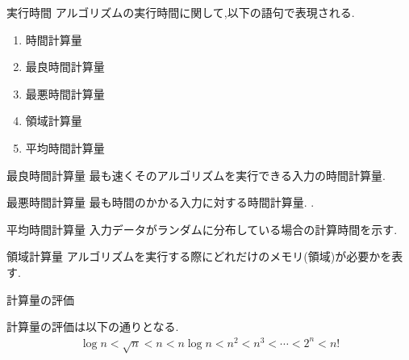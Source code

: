 \begin{frame}{実行時間}
    アルゴリズムの実行時間に関して,以下の語句で表現される.
    \begin{enumerate}
        \item 時間計算量
        \item 最良時間計算量
        \item 最悪時間計算量
        \item 領域計算量
        \item 平均時間計算量
    \end{enumerate}
    \begin{block}{最良時間計算量}
        最も速くそのアルゴリズムを実行できる入力の時間計算量.
    \end{block}
    \begin{block}{最悪時間計算量}
        最も時間のかかる入力に対する時間計算量. .
    \end{block}
    \begin{block}{平均時間計算量}
        入力データがランダムに分布している場合の計算時間を示す.
    \end{block}
    \begin{block}{領域計算量}
        アルゴリズムを実行する際にどれだけのメモリ(領域)が必要かを表す.
    \end{block}
\end{frame}

\begin{frame}{計算量の評価}
\begin{block}{}
計算量の評価は以下の通りとなる.
    \begin{align*}
    \log{n} < \sqrt{n} < n < n\log{n} < n^2 < n^3 < \cdots < 2^n < n!
    \end{align*}
\end{block}
\end{frame}

